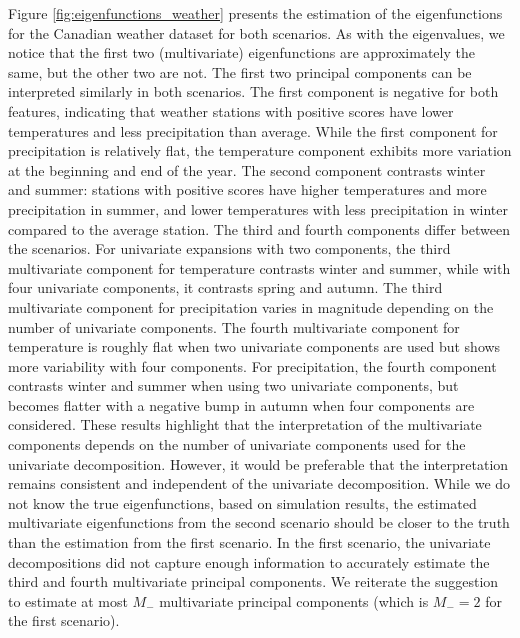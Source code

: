 \documentclass{article}
\newcounter{rem}
\newcounter{th}
\newcounter{scenario}[section]
\begin{document}
Figure \ref{fig:eigenfunctions_weather} presents the estimation of the eigenfunctions for the Canadian weather dataset for both scenarios. As with the eigenvalues, we notice that the first two (multivariate) eigenfunctions are approximately the same, but the other two are not. The first two principal components can be interpreted similarly in both scenarios. The first component is negative for both features, indicating that weather stations with positive scores have lower temperatures and less precipitation than average. While the first component for precipitation is relatively flat, the temperature component exhibits more variation at the beginning and end of the year. The second component contrasts winter and summer: stations with positive scores have higher temperatures and more precipitation in summer, and lower temperatures with less precipitation in winter compared to the average station. The third and fourth components differ between the scenarios. For univariate expansions with two components, the third multivariate component for temperature contrasts winter and summer, while with four univariate components, it contrasts spring and autumn. The third multivariate component for precipitation varies in magnitude depending on the number of univariate components. The fourth multivariate component for temperature is roughly flat when two univariate components are used but shows more variability with four components. For precipitation, the fourth component contrasts winter and summer when using two univariate components, but becomes flatter with a negative bump in autumn when four components are considered. These results highlight that the interpretation of the multivariate components depends on the number of univariate components used for the univariate decomposition. However, it would be preferable that the interpretation remains consistent and independent of the univariate decomposition. While we do not know the true eigenfunctions, based on simulation results, the estimated multivariate eigenfunctions from the second scenario should be closer to the truth than the estimation from the first scenario. In the first scenario, the univariate decompositions did not capture enough information to accurately estimate the third and fourth multivariate principal components. We reiterate the suggestion to estimate at most $M_{-}$ multivariate principal components (which is $M_{-} = 2$ for the first scenario).
\end{document}
